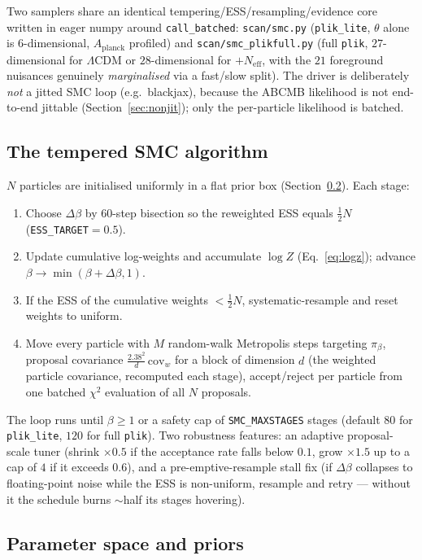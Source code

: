 \documentclass[11pt]{article}
\newcommand{\code}[1]{\texttt{\small #1}}
\newcommand{\file}[1]{\texttt{\small #1}}
\newcommand{\Neff}{N_{\mathrm{eff}}}
\newcommand{\chisq}{\chi^2}
\begin{document}
Two samplers share an identical tempering/ESS/resampling/evidence core
written in eager numpy around \code{call\_batched}: \file{scan/smc.py}
(\code{plik\_lite}, $\theta$ alone is $6$-dimensional, $A_{\mathrm{planck}}$
profiled) and \file{scan/smc\_plikfull.py} (full \code{plik},
$27$-dimensional for $\Lambda$CDM or $28$-dimensional for $+\Neff$, with
the $21$ foreground nuisances genuinely \emph{marginalised} via a
fast/slow split). The driver is deliberately \emph{not} a jitted SMC loop
(e.g.\ blackjax), because the \textsc{ABCMB} likelihood is not
end-to-end jittable (Section~\ref{sec:nonjit}); only the per-particle
likelihood is batched.

\subsection{The tempered SMC algorithm}
\label{sec:smcalgo}

$N$ particles are initialised uniformly in a flat prior box
(Section~\ref{sec:smcprior}). Each stage:
\begin{enumerate}[leftmargin=2em,itemsep=1pt]
\item Choose $\Delta\beta$ by $60$-step bisection so the reweighted ESS
equals $\tfrac12N$ (\code{ESS\_TARGET}$=0.5$).
\item Update cumulative log-weights and accumulate $\log Z$
(Eq.~\eqref{eq:logz}); advance $\beta\to\min(\beta+\Delta\beta,1)$.
\item If the ESS of the cumulative weights $<\tfrac12N$, systematic-resample
and reset weights to uniform.
\item Move every particle with $M$ random-walk Metropolis steps targeting
$\pi_\beta$, proposal covariance $\frac{2.38^2}{d}\,\mathrm{cov}_w$ for a
block of dimension $d$ (the weighted particle covariance, recomputed each
stage), accept/reject per particle from one batched $\chisq$ evaluation of
all $N$ proposals.
\end{enumerate}
The loop runs until $\beta\ge1$ or a safety cap of \code{SMC\_MAXSTAGES}
stages (default $80$ for \code{plik\_lite}, $120$ for full \code{plik}).
Two robustness features: an adaptive proposal-scale tuner (shrink
$\times0.5$ if the acceptance rate falls below $0.1$, grow $\times1.5$ up
to a cap of $4$ if it exceeds $0.6$), and a pre-emptive-resample stall fix
(if $\Delta\beta$ collapses to floating-point noise while the ESS is
non-uniform, resample and retry --- without it the schedule burns
$\sim$half its stages hovering).

\subsection{Parameter space and priors}
\label{sec:smcprior}
\end{document}
